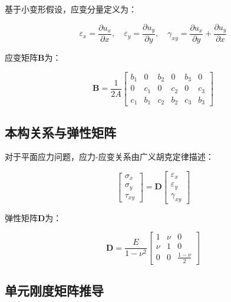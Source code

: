 \documentclass[12pt,a4paper]{article}
\begin{document}
基于小变形假设，应变分量定义为：

\begin{equation}
\varepsilon_x = \frac{\partial u_x}{\partial x}, \quad \varepsilon_y = \frac{\partial u_y}{\partial y}, \quad \gamma_{xy} = \frac{\partial u_x}{\partial y} + \frac{\partial u_y}{\partial x}
\end{equation}

应变矩阵$\mathbf{B}$为：

\begin{equation}
\mathbf{B} = \frac{1}{2A} \begin{bmatrix}
b_1 & 0 & b_2 & 0 & b_3 & 0 \\
0 & c_1 & 0 & c_2 & 0 & c_3 \\
c_1 & b_1 & c_2 & b_2 & c_3 & b_3
\end{bmatrix}
\end{equation}

\subsection{本构关系与弹性矩阵}

对于平面应力问题，应力-应变关系由广义胡克定律描述：

\begin{equation}
\begin{bmatrix} \sigma_x \\ \sigma_y \\ \tau_{xy} \end{bmatrix} = \mathbf{D} \begin{bmatrix} \varepsilon_x \\ \varepsilon_y \\ \gamma_{xy} \end{bmatrix}
\end{equation}

弹性矩阵$\mathbf{D}$为：

\begin{equation}
\mathbf{D} = \frac{E}{1-\nu^2} \begin{bmatrix}
1 & \nu & 0 \\
\nu & 1 & 0 \\
0 & 0 & \frac{1-\nu}{2}
\end{bmatrix}
\end{equation}

\subsection{单元刚度矩阵推导}
\end{document}
